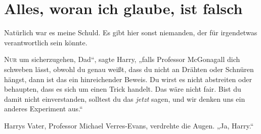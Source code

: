 \chapter{Alles, woran ich glaube, ist falsch}

\begin{chapterOpeningQuote}
Natürlich war es meine Schuld. Es gibt hier sonst niemanden, der für irgendetwas verantwortlich sein könnte.
\end{chapterOpeningQuote}

\lettrine[ante=„]{N}{ur} um sicherzugehen, Dad“, sagte Harry, „falls Professor McGonagall dich schweben lässt, obwohl du genau weißt, dass du nicht an Drähten oder Schnüren hängst, dann ist das ein hinreichender Beweis. Du wirst es nicht abstreiten oder behaupten, dass es sich um einen Trick handelt. Das wäre nicht fair. Bist du damit nicht einverstanden, solltest du das \emph{jetzt} sagen, und wir denken uns ein anderes Experiment aus.“

Harrys Vater, Professor Michael Verres-Evans, verdrehte die Augen.
„Ja, Harry.“

